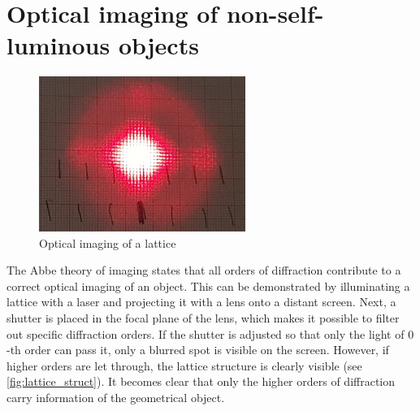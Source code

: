 \chapter{Optical imaging of non-self-luminous objects}
\begin{figure}[htb]
	\centering
	\includegraphics[width=0.6\textwidth]{./img/lattice_struct.jpg}
	\caption[Optical imaging of a lattice]{Optical imaging of a lattice}
	\label{fig:lattice_struct}
\end{figure}

The Abbe theory of imaging states that all orders of diffraction contribute to a correct optical imaging of an object.
This can be demonstrated by illuminating a lattice with a laser and projecting it with a lens onto a distant screen.
Next, a shutter is placed in the focal plane of the lens, which makes it possible to filter out specific diffraction orders.
If the shutter is adjusted so that only the light of $0$-th order can pass it, only a blurred spot is visible on the screen.
However, if higher orders are let through, the lattice structure is clearly visible (see \autoref{fig:lattice_struct}).
It becomes clear that only the higher orders of diffraction carry information of the geometrical object.
